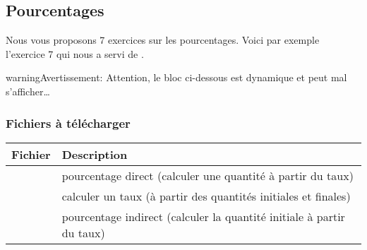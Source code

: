 \documentclass[letterpaper,10pt,french]{sphinxmanual}
\begin{document}
\subsection{Pourcentages}
\label{\detokenize{analyse alg_xe8bre - pourcentages:pourcentages}}\label{\detokenize{analyse alg_xe8bre - pourcentages::doc}}
Nous vous proposons 7 exercices sur les pourcentages.
Voici par exemple l’exercice 7 qui nous a servi de .

\begin{sphinxadmonition}{warning}{Avertissement:}
Attention, le bloc ci-dessous est dynamique et peut mal s’afficher…
\end{sphinxadmonition}




\subsubsection{Fichiers à télécharger}
\label{\detokenize{analyse alg_xe8bre - pourcentages:fichiers-a-telecharger}}

\begin{savenotes}\sphinxattablestart
\centering
{}
\label{\detokenize{analyse alg_xe8bre - pourcentages:id1}}
\sphinxaftercaption
\begin{tabulary}{\linewidth}[t]{|T|T|}
\hline
\sphinxstyletheadfamily 
Fichier
&\sphinxstyletheadfamily 
Description
\\
\hline
{}
&
pourcentage direct (calculer une quantité à partir du taux)
\\
\hline
{}
&
calculer un taux (à partir des quantités initiales et finales)
\\
\hline
{}
&
pourcentage indirect (calculer la quantité initiale à partir du taux)
\\
\hline
\end{tabulary}
\par
\sphinxattableend\end{savenotes}
\end{document}
